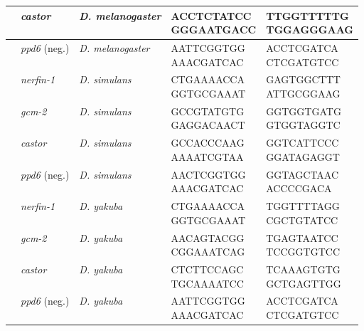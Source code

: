 \begin{center}
\begin{longtable}{|l|l|p{2.2cm}|p{3.3cm}|p{3.2cm}|}
         & \emph{castor}         & \emph{D. melanogaster}  & \parbox[t]{3cm}{ACCTCTATCC\\ GGGAATGACC} & \parbox[t]{3cm}{TTGGTTTTTG\\ TGGAGGGAAG} \\ \hline
         & \emph{ppd6} (neg.)    & \emph{D. melanogaster}  & \parbox[t]{3cm}{AATTCGGTGG\\ AAACGATCAC} & \parbox[t]{3cm}{ACCTCGATCA\\ CTCGATGTCC} \\ \hline
         & \emph{nerfin-1}       & \emph{D. simulans}      & \parbox[t]{3cm}{CTGAAAACCA\\ GGTGCGAAAT} & \parbox[t]{3cm}{GAGTGGCTTT\\ ATTGCGGAAG} \\ \hline
         & \emph{gcm-2}          & \emph{D. simulans}      & \parbox[t]{3cm}{GCCGTATGTG\\ GAGGACAACT} & \parbox[t]{3cm}{GGTGGTGATG\\ GTGGTAGGTC} \\ \hline
         & \emph{castor}         & \emph{D. simulans}      & \parbox[t]{3cm}{GCCACCCAAG\\ AAAATCGTAA} & \parbox[t]{3cm}{GGTCATTCCC\\ GGATAGAGGT} \\ \hline
         & \emph{ppd6} (neg.)    & \emph{D. simulans}      & \parbox[t]{3cm}{AACTCGGTGG\\ AAACGATCAC} & \parbox[t]{3cm}{GGTAGCTAAC\\ ACCCCGACA}  \\ \hline
         & \emph{nerfin-1}       & \emph{D. yakuba}        & \parbox[t]{3cm}{CTGAAAACCA\\ GGTGCGAAAT} & \parbox[t]{3cm}{TGGTTTTAGG\\ CGCTGTATCC} \\ \hline
         & \emph{gcm-2}          & \emph{D. yakuba}        & \parbox[t]{3cm}{AACAGTACGG\\ CGGAAATCAG} & \parbox[t]{3cm}{TGAGTAATCC\\ TCCGGTGTCC} \\ \hline
         & \emph{castor}         & \emph{D. yakuba}        & \parbox[t]{3cm}{CTCTTCCAGC\\ TGCAAAATCC} & \parbox[t]{3cm}{TCAAAGTGTG\\ GCTGAGTTGG} \\ \hline
         & \emph{ppd6} (neg.)    & \emph{D. yakuba}        & \parbox[t]{3cm}{AATTCGGTGG\\ AAACGATCAC} & \parbox[t]{3cm}{ACCTCGATCA\\ CTCGATGTCC} \\ \hline

\end{longtable}
\end{center}

